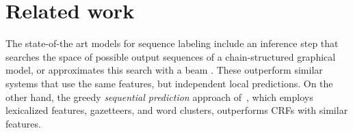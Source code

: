 \section{Related work}


The state-of-the art models for sequence labeling include an inference step that searches the space of possible output sequences of a chain-structured graphical model, or approximates this search with a beam \citep{collobert2011natural, weiss2015structured, lample2016neural, ma2016end, chiu2016named}. These outperform similar systems that use the same features, but independent local predictions. On the other hand, the greedy \emph{sequential prediction} \citep{daume2009search} approach of~\citet{ratinov2009design}, which employs lexicalized features, gazetteers, and word clusters, outperforms CRFs with similar features. 








